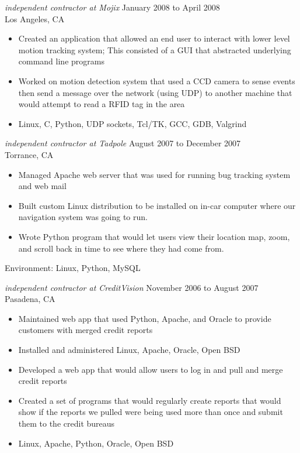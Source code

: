 \documentclass{res}
\begin{document}
\begin{resume}
{\sl independent contractor at Mojix} \hfill January 2008 to April 2008\\
Los Angeles, CA
\begin{itemize}

\item Created an application that allowed an end user to interact
with lower level motion tracking system; This consisted of a GUI
that abstracted underlying command line programs

\item Worked on  motion detection system that used a CCD camera to sense
events then send a message over the network (using UDP) to another
machine that would attempt to read a RFID tag in the area

\item Linux, C, Python, UDP sockets, Tcl/TK, GCC, GDB, Valgrind
\end{itemize}

{\sl independent contractor at Tadpole} \hfill August 2007 to December 2007\\
Torrance, CA
\begin{itemize}

\item Managed Apache web server that was used for running bug
tracking system and web mail

\item Built custom Linux distribution to be installed on in-car
computer where our navigation system was going to run.

\item Wrote Python program that would let users view their location
map, zoom, and scroll back in time to see where they had come from.

\end{itemize}

Environment:  Linux, Python, MySQL

{\sl independent contractor at CreditVision} \hfill November 2006 to August 2007\\
Pasadena, CA
\begin{itemize}
\item Maintained web app that used Python, Apache, and Oracle to
provide customers with merged credit reports
\item Installed and administered Linux, Apache, Oracle, Open BSD
\item Developed a web app that would allow users to log in and
pull and merge credit reports
\item Created a set of programs that would regularly create reports
that would show if the reports we pulled were being used more than
once and submit them to the credit bureaus
\item  Linux, Apache, Python, Oracle, Open BSD
\end{itemize}


\end{resume}
\end{document}
